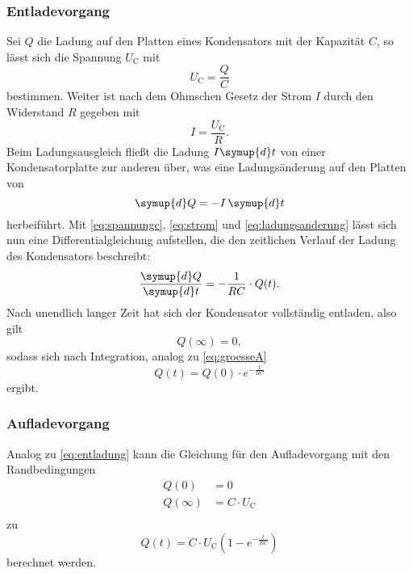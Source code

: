 \subsubsection{Entladevorgang}
\label{eq:entladung}
Sei $Q$ die Ladung auf den Platten eines Kondensators mit der Kapazität $C$, so lässt sich die Spannung $U_{\text{C}}$ mit
\begin{equation}
U_{\text{C}} = \frac{Q}{C}
\label{eq:spannungc}
\end{equation}
bestimmen. Weiter ist nach dem Ohmschen Gesetz der Strom $I$ durch den Widerstand $R$ gegeben mit
\begin{equation}
I = \frac{U_{\text{C}}}{R}.
\label{eq:strom}
\end{equation}
Beim Ladungsausgleich fließt die Ladung $I \symup{d}t$ von einer Kondensatorplatte zur anderen über, was eine Ladungsänderung auf den Platten von 
\begin{equation}
\symup{d}Q = -I\,\symup{d}t
\label{eq:ladungsanderung}
\end{equation}
herbeiführt. Mit \eqref{eq:spannungc}, \eqref{eq:strom} und \eqref{eq:ladungsanderung} lässt sich nun eine Differentialgleichung aufstellen, 
die den zeitlichen Verlauf der Ladung des Kondensators beschreibt:
\begin{equation*}
\frac{\symup{d}Q}{\symup{d}t} = -\frac{1}{RC}\cdot Q(t).
\end{equation*}
Nach unendlich langer Zeit hat sich der Kondensator vollständig entladen, also gilt
\begin{equation*}
Q(\infty) = 0,
\end{equation*}
sodass sich nach Integration, analog zu \eqref{eq:groesseA}
\begin{equation}
\label{eqn:Meth1}
Q(t) = Q(0)\cdot e^{-\frac{t}{RC}}
\end{equation}
ergibt.

\subsubsection{Aufladevorgang}
Analog zu \eqref{eq:entladung} kann die Gleichung für den Aufladevorgang mit den Randbedingungen 
\begin{equation*}
\begin{aligned}
Q(0) &= 0 \\
Q(\infty) &= C\cdot U_{\text{C}} \\
\end{aligned}
\end{equation*}
zu 
\begin{equation*}
Q(t) = C\cdot U_{\text{C}} (1- e^{-\frac{t}{RC}})
\end{equation*}
berechnet werden.


